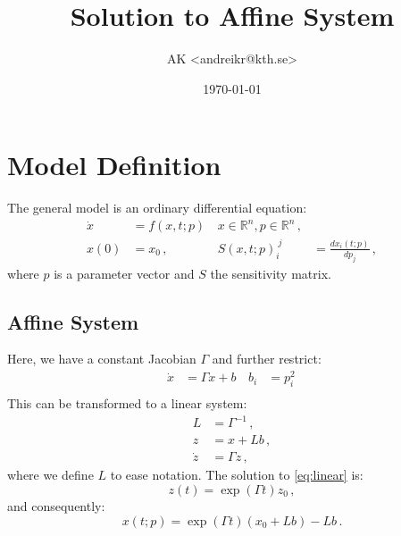 \documentclass[utf8,english,DIV=12]{scrartcl}
\author{AK <andreikr@kth.se>}
\date{\today}
\title{Solution to Affine System}
\begin{document}
\maketitle

\section{Model Definition}
\label{sec:model}

The general model is an ordinary differential equation:
\begin{align}
  \dot x&=f(x,t;p)\, & x\in\mathbb{R}^n, p\in\mathbb{R}^n\,,\\
  x(0) &= x_0\,, & S(x,t;p)_i^{~j}&=\frac{dx_i(t;p)}{dp_j}\,,
\end{align}
where $p$ is a parameter vector and $S$ the sensitivity matrix. 

\subsection{Affine System}
\label{sec:affine}

Here, we have a constant Jacobian $\Gamma$ and further restrict:
\begin{align}
  \dot x&=\Gamma x + b\, & b_i&=p_i^2\,\label{eq:affine}\\
\end{align}
This can be transformed to a linear system:
\begin{equation}
  \begin{split}
  L&=\Gamma^{-1}\,,\\
  z&=x+L b\,,\\
  \dot z&=\Gamma z\,,
  \end{split}\label{eq:linear}
\end{equation}
where we define $L$ to ease notation. The solution to \eqref{eq:linear} is:
\begin{equation}
  z(t) = \exp\left(\Gamma t\right) z_0\,,
\end{equation}
and consequently:
\begin{equation}
  x(t;p) = \exp\left(\Gamma t\right) (x_0 + Lb) - Lb \,.\label{eq:sol}
\end{equation}
\end{document}
